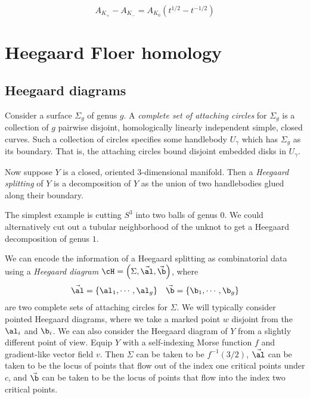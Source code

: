 \documentclass{amsproc}
\begin{document}
\begin{thm}
\begin{equation}
A_{K_+} - A_{K_-} = A_{K_0} \left( t^{1/2} - t^{-1/2} \right)
\end{equation}
\end{thm}


\section{Heegaard Floer homology}

\subsection{Heegaard diagrams}

Consider a surface $\Sigma_g$ of genus $g$. 
A \emph{complete set of attaching circles} for $\Sigma_g$
is a collection of $g$ pairwise disjoint, homologically linearly independent simple,
closed curves. 
Such a collection of circles specifies some handlebody $U_\gamma$ which has
$\Sigma_g$ as its boundary. That is, the attaching circles bound disjoint embedded disks in $U_\gamma$.

Now suppose $Y$ is a closed, oriented $3$-dimensional manifold. 
Then a \emph{Heegaard splitting} of $Y$ is a decomposition of $Y$ as the union of two handlebodies
glued along their boundary. 

\begin{exm}
The simplest example is cutting $S^3$ into two balls of genus $0$.
We could alternatively cut out a tubular neighborhood of the unknot to get
a Heegaard decomposition of genus $1$.
\end{exm}

We can encode the information of a Heegaard splitting as combinatorial data using  
a \emph{Heegaard diagram} $\cH = \left( \Sigma, \vec{\al} , \vec{\b} \right)$, where
\begin{align}
\vec{\al} = \left\{ \al_1 , \cdots , \al_g \right\}
&&
\vec{\b} = \left\{ \b_1 , \cdots , \b_g \right\}
\end{align}
are two complete sets of attaching circles for $\Sigma$.
We will typically consider pointed Heegaard diagrams, where we take a marked point $w$
disjoint from the $\al_i$ and $\b_i$.
We can also consider the Heegaard diagram of $Y$ from a slightly different point of view.
Equip $Y$ with a self-indexing Morse function $f$ and gradient-like vector field $v$. 
Then $\Sigma$ can be taken to be $f^{-1}\left( 3/2 \right)$, 
$\vec{\al}$ can be taken to be the locus of points 
that flow out of the index one critical points under $c$,
and $\vec{\b}$ can be taken to be the locus of points that flow into the index two 
critical points.
\end{document}
